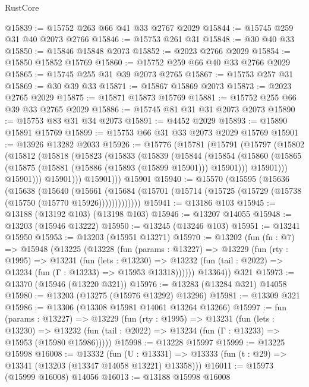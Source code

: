 \begin{lexlean}{RustCore}
\begin{coremodule}
@15839 := @15752 @263 @66 @41 @33 @2767 @2029
@15844 := @15745 @259 @31 @40 @2073 @2766
@15846 := @15753 @261 @31
@15848 := @30 @40 @33
@15850 := @15846 @15848 @2073
@15852 := @2023 @2766 @2029
@15854 := @15850 @15852 @15769
@15860 := @15752 @259 @66 @40 @33 @2766 @2029
@15865 := @15745 @255 @31 @39 @2073 @2765
@15867 := @15753 @257 @31
@15869 := @30 @39 @33
@15871 := @15867 @15869 @2073
@15873 := @2023 @2765 @2029
@15875 := @15871 @15873 @15769
@15881 := @15752 @255 @66 @39 @33 @2765 @2029
@15886 := @15745 @81 @31 @31 @2073 @2073
@15890 := @15753 @83 @31 @34 @2073
@15891 := @4452 @2029
@15893 := @15890 @15891 @15769
@15899 := @15753 @66 @31 @33 @2073 @2029 @15769
@15901 := @13926 @13282 @2033
@15926 := @15776
    (@15781
      (@15791
        (@15797
          (@15802
            (@15812
              (@15818
                (@15823
                  (@15833
                    (@15839
                      (@15844
                        (@15854
                          (@15860
                            (@15865 (@15875 (@15881 (@15886 (@15893 (@15899 @15901))) @15901)))
                            @15901)))
                      @15901)))
                @15901)))
          @15901)))
    @15901
@15940 := @15570
    (@15595
      (@15636
        (@15638
          (@15640
            (@15661
              (@15684 (@15701 (@15714 (@15725 (@15729 (@15738 (@15750 (@15770 @15926)))))))))))))
@15941 := @13186 @103
@15945 := @13188 (@13192 @103) (@13198 @103)
@15946 := @13207 @14055
@15948 := @13203 (@15946 @13222)
@15950 := @13245 (@13246 @103)
@15951 := @13241 @15950
@15953 := @13203 (@15951 @13271)
@15970 := @13202
    (fun (fn : @7) =>
    @15948
      (@13225
        (@13228
          (fun (params : @13227) =>
          @13229
            (fun (rty : @1995) =>
            @13231
              (fun (lets : @13230) =>
              @13232 (fun (tail : @2022) => @13234 (fun (Γ : @13233) => @15953 @13318))))))
        @13364))
    @321
@15973 := @13370 (@15946 (@13220 @321))
@15976 := @13283 (@13284 @321) @14058
@15980 := @13203 (@13275 (@15976 @13292) @13296)
@15981 := @13309 @321
@15986 := @13306 (@13308 @15981 @14061 @13264 @13266)
@15997 := fun (params : @13227) =>
  @13229
    (fun (rty : @1995) =>
    @13231
      (fun (lets : @13230) =>
      @13232 (fun (tail : @2022) => @13234 (fun (Γ : @13233) => @15953 (@15980 @15986)))))
@15998 := @13228 @15997
@15999 := @13225 @15998
@16008 := @13332
    (fun (U : @13331) => @13333 (fun (t : @29) => @13341 (@13203 (@13347 @14058 @13221) @13358)))
@16011 := @15973 (@15999 @16008) @14056
@16013 := @13188 @15998 @16008

\end{coremodule}
\end{lexlean}

